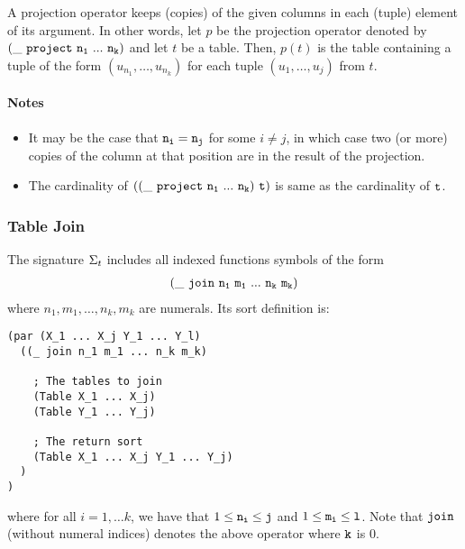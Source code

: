 \documentclass[english,a4paper,10pt]{article}
\begin{document}
A projection operator keeps (copies) of the given columns
in each (tuple) element of its argument.
In other words,
let $p$ be the projection operator denoted by ${\tt (\_\ project\ n_1\ ...\ n_k)}$
and let $t$ be a table.
Then, $p(t)$
is the table containing a tuple of the form
$(u_{n_1}, \ldots, u_{n_k})$
for each tuple $(u_1, \ldots, u_j)$ from $t$.

\paragraph{Notes}
\begin{itemize}
\item
It may be the case that ${\tt n_i} = {\tt n_j}$ for some $i \neq j$,
in which case two (or more) copies of the column at that position
are in the result of the projection.
\item
The cardinality of $\syntax{((\_\ project\ n_1\ ...\ n_k)\ t)}$ is
same as the cardinality of ${\tt t}$.
\end{itemize}

\subsubsection{Table Join}
The signature $\Sigma_{t}$ includes 
all indexed functions symbols of the form
\begin{align*}
{\tt  
(\_\ join\ n_1\ m_1\ ...\ n_k\ m_k)
}
\end{align*}
where $n_1, m_1, \ldots, n_k, m_k$ are numerals.
Its sort definition is:

\begin{verbatim}
(par (X_1 ... X_j Y_1 ... Y_l)
  ((_ join n_1 m_1 ... n_k m_k)
  
    ; The tables to join
    (Table X_1 ... X_j)
    (Table Y_1 ... Y_j)
    
    ; The return sort
    (Table X_1 ... X_j Y_1 ... Y_j)
  )
)
\end{verbatim}
where for all $i = 1, \ldots k$,
we have that $1 \leq {\tt n_i} \leq {\tt j}$ and $1 \leq {\tt m_i} \leq {\tt l}$. 
Note that
${\tt join}$ (without numeral indices) denotes the above operator where ${\tt k}$ is $0$.
\end{document}
